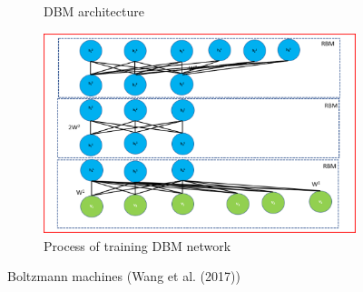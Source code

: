 \documentclass{article}
\begin{document}
\begin{figure}[h!]
\begin{subfigure}[b]{.49\textwidth}
  \caption{DBM architecture}
  \label{fig:dbm}
\end{subfigure}
\hfill
\begin{subfigure}[b]{.49\textwidth}
  \centering
  \includegraphics[width=\linewidth]{lab4/dbm.pdf}
  \caption{Process of training DBM network}
  \label{fig:traindbm}
\end{subfigure}
\caption{Boltzmann machines (Wang et al. (2017))}
\label{fig:bmarchi}
\end{figure}
\end{document}
